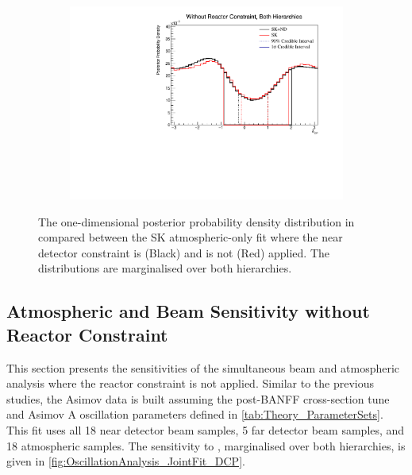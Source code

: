 \begin{figure}[h]
  \begin{subfigure}[t]{0.98\textwidth}
    \includegraphics[width=\textwidth, trim={0mm 0mm 0mm 0mm}, clip,page=1]{Figures/OA/SKOnlyFit_noND/ContourComparison_1D_dcp_BH_2_woRC_UnSmeared_CredibleInterval.pdf}
  \end{subfigure}
  \caption{The one-dimensional posterior probability density distribution in  compared between the SK atmospheric-only fit where the near detector constraint is (Black) and is not (Red) applied. The distributions are marginalised over both hierarchies.}
  \label{fig:OscillationAnalysis_SKOnly_NoND_DCP}
\end{figure}

\clearpage
\subsection{Atmospheric and Beam Sensitivity without Reactor Constraint}
\label{sec:OscillationAnalysis_JointFit}

This section presents the sensitivities of the simultaneous beam and atmospheric analysis where the reactor constraint is not applied. Similar to the previous studies, the Asimov data is built assuming the post-BANFF cross-section tune and Asimov A oscillation parameters defined in \autoref{tab:Theory_ParameterSets}. This fit uses all 18 near detector beam samples, 5 far detector beam samples, and 18 atmospheric samples. The sensitivity to , marginalised over both hierarchies, is given in \autoref{fig:OscillationAnalysis_JointFit_DCP}.

